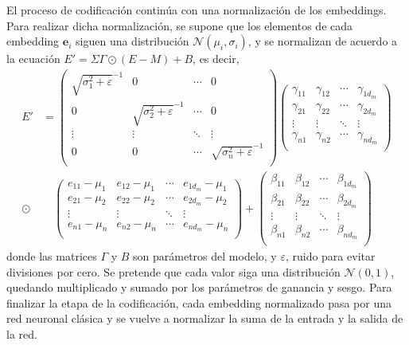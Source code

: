 				El proceso de codificación continúa con una normalización de los embeddings. Para realizar dicha normalización\cite{normalization}, se supone que los elementos de cada embedding $\textbf{e}_i$ siguen una distribución $\mathcal{N}(\mu_i, \sigma_i)$, y se normalizan de acuerdo a la ecuación $E' = \Sigma\Gamma\odot(E - M) + B$, es decir, 
				\begin{align*}
					E' &= \begin{pmatrix}
						\sqrt{\sigma^2_1 + \varepsilon}^{-1} & 0 & \cdots & 0\\
						0 & \sqrt{\sigma^2_2 + \varepsilon}^{-1} & \cdots & 0\\
						\vdots & \vdots & \ddots & \vdots\\
						0 & 0 & \cdots & \sqrt{\sigma^2_n + \varepsilon}^{-1}\\
					\end{pmatrix}
					\begin{pmatrix}
						\gamma_{11} & \gamma_{12} & \cdots & \gamma_{1d_m}\\
						\gamma_{21} & \gamma_{22} & \cdots & \gamma_{2d_m}\\
						\vdots & \vdots & \ddots & \vdots\\
						\gamma_{n1} & \gamma_{n2} & \cdots & \gamma_{nd_m}\\
					\end{pmatrix} \\
					\odot&\quad \begin{pmatrix}
						e_{11} - \mu_1 & e_{12} - \mu_1 & \cdots & e_{1d_m} - \mu_1\\
						e_{21} - \mu_2 & e_{22} - \mu_2 & \cdots & e_{2d_m} - \mu_2\\
						\vdots & \vdots & \ddots & \vdots\\
						e_{n1} - \mu_n & e_{n2} - \mu_n & \cdots & e_{nd_m} - \mu_n\\
					\end{pmatrix} + \begin{pmatrix}
						\beta_{11} & \beta_{12} & \cdots & \beta_{1d_m}\\
						\beta_{21} & \beta_{22} & \cdots & \beta_{2d_m}\\
						\vdots & \vdots & \ddots & \vdots\\
						\beta_{n1} & \beta_{n2} & \cdots & \beta_{nd_m}\\
					\end{pmatrix}
				\end{align*}
				donde las matrices $\Gamma$ y $B$ son parámetros del modelo, y $\varepsilon$, ruido para evitar divisiones por cero. Se pretende que cada valor siga una distribución $\mathcal{N}(0, 1)$, quedando multiplicado y sumado por los parámetros de ganancia y sesgo. Para finalizar la etapa de la codificación, cada embedding normalizado pasa por una red neuronal clásica y se vuelve a normalizar la suma de la entrada y la salida de la red. 
				
